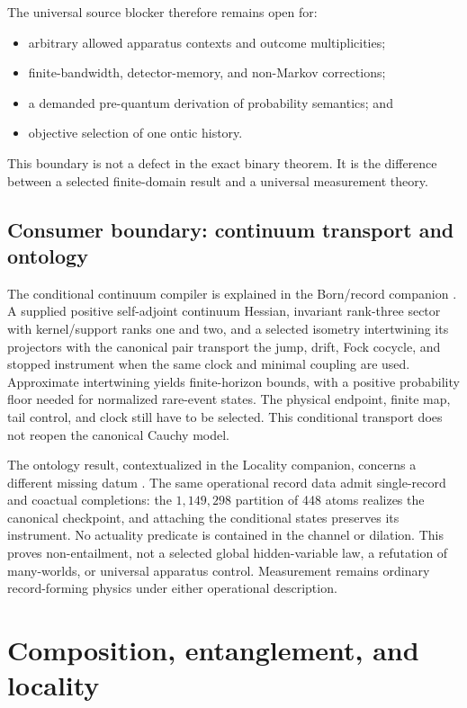 \documentclass[11pt]{article}
\theoremstyle{definition}
\theoremstyle{remark}
\let\MTToriginalitem\item
\renewcommand{\item}{\par\MTToriginalitem}
\begin{document}
The universal source blocker therefore remains open for:
\begin{itemize}[leftmargin=2em]
\item arbitrary allowed apparatus contexts and outcome multiplicities;
\item finite-bandwidth, detector-memory, and non-Markov corrections;
\item a demanded pre-quantum derivation of probability semantics; and
\item objective selection of one ontic history.
\end{itemize}
This boundary is not a defect in the exact binary theorem.  It is the
difference between a selected finite-domain result and a universal
measurement theory.

\subsection{Consumer boundary: continuum transport and ontology}
\label{sec:recorder-consumer}
The conditional continuum compiler is explained in the Born/record companion
\cite{BornCompanionV3,FrozenContinuumConsumer}. A supplied positive
self-adjoint continuum Hessian, invariant rank-three sector with kernel/support
ranks one and two, and a selected isometry intertwining its projectors with
the canonical pair transport the jump, drift, Fock cocycle, and stopped
instrument when the same clock and minimal coupling are used. Approximate
intertwining yields finite-horizon bounds, with a positive probability floor
needed for normalized rare-event states. The physical endpoint, finite map,
tail control, and clock still have to be selected. This conditional transport
does not reopen the canonical Cauchy model.

The ontology result, contextualized in the Locality companion, concerns a
different missing datum \cite{LocalityCompanionV2,FrozenOntologyConsumer}.
The same operational record data admit single-record and coactual
completions: the \(1,149,298\) partition of 448 atoms realizes the canonical
checkpoint, and attaching the conditional states preserves its instrument.
No actuality predicate is contained in the channel or dilation. This proves
non-entailment, not a selected global hidden-variable law, a refutation of
many-worlds, or universal apparatus control. Measurement remains ordinary
record-forming physics under either operational description.

\section{Composition, entanglement, and locality}
\label{sec:composition}
\end{document}
